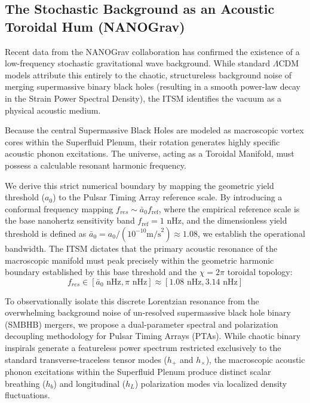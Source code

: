 \documentclass[aps,prd,10pt,twocolumn,superscriptaddress,nofootinbib]{revtex4-2}
\begin{document}
\subsection{The Stochastic Background as an Acoustic Toroidal Hum (NANOGrav)}
Recent data from the NANOGrav collaboration \cite{nanograv} has confirmed the existence of a low-frequency stochastic gravitational wave background. While standard $\Lambda$CDM models attribute this entirely to the chaotic, structureless background noise of merging supermassive binary black holes (resulting in a smooth power-law decay in the Strain Power Spectral Density), the ITSM identifies the vacuum as a physical acoustic medium. 

Because the central Supermassive Black Holes are modeled as macroscopic vortex cores within the Superfluid Plenum, their rotation generates highly specific acoustic phonon excitations. The universe, acting as a Toroidal Manifold, must possess a calculable resonant harmonic frequency.

We derive this strict numerical boundary by mapping the geometric yield threshold ($a_0$) to the Pulsar Timing Array reference scale. By introducing a conformal frequency mapping $f_{res} \sim \bar{a}_0 f_{\text{ref}}$, where the empirical reference scale is the base nanohertz sensitivity band $f_{\text{ref}} = 1 \text{ nHz}$, and the dimensionless yield threshold is defined as $\bar{a}_0 = a_0 / (10^{-10} \text{m/s}^2) \approx 1.08$, we establish the operational bandwidth. The ITSM dictates that the primary acoustic resonance of the macroscopic manifold must peak precisely within the geometric harmonic boundary established by this base threshold and the $\chi=2\pi$ toroidal topology:
\begin{equation}
f_{res} \in [\bar{a}_0 \text{ nHz}, \pi \text{ nHz}] \approx [1.08 \text{ nHz}, 3.14 \text{ nHz}]
\end{equation}

To observationally isolate this discrete Lorentzian resonance from the overwhelming background noise of un-resolved supermassive black hole binary (SMBHB) mergers, we propose a dual-parameter spectral and polarization decoupling methodology for Pulsar Timing Arrays (PTAs). While chaotic binary inspirals generate a featureless power spectrum restricted exclusively to the standard transverse-traceless tensor modes ($h_+$ and $h_{\times}$), the macroscopic acoustic phonon excitations within the Superfluid Plenum produce distinct scalar breathing ($h_b$) and longitudinal ($h_L$) polarization modes via localized density fluctuations. 
\end{document}
